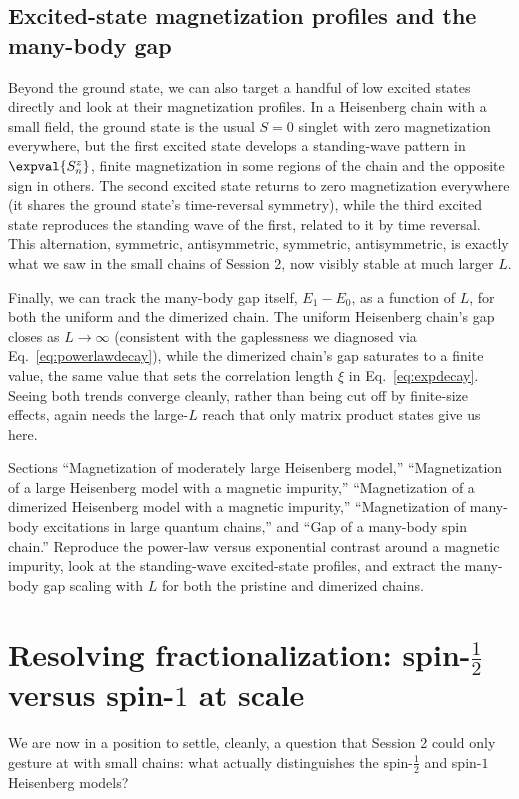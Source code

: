 \documentclass[all_sessions.tex]{subfiles}
\begin{document}
\subsection{Excited-state magnetization profiles and the many-body gap}
Beyond the ground state, we can also target a handful of low excited states directly and look at
their magnetization profiles. In a Heisenberg chain with a small field, the ground state is the
usual $S=0$ singlet with zero magnetization everywhere, but the first excited state develops a
standing-wave pattern in $\expval{S_n^z}$, finite magnetization in some regions of the chain and
the opposite sign in others. The second excited state returns to zero magnetization everywhere
(it shares the ground state's time-reversal symmetry), while the third excited state reproduces
the standing wave of the first, related to it by time reversal. This alternation, symmetric,
antisymmetric, symmetric, antisymmetric, is exactly what we saw in the small chains of Session 2,
now visibly stable at much larger $L$.

Finally, we can track the many-body gap itself, $E_1 - E_0$, as a function of $L$, for both the
uniform and the dimerized chain. The uniform Heisenberg chain's gap closes as $L\to\infty$
(consistent with the gaplessness we diagnosed via Eq.~\eqref{eq:powerlawdecay}), while the
dimerized chain's gap saturates to a finite value, the same value that sets the correlation length
$\xi$ in Eq.~\eqref{eq:expdecay}. Seeing both trends converge cleanly, rather than being cut off by
finite-size effects, again needs the large-$L$ reach that only matrix product states give us here.

\begin{notebook}
Sections ``Magnetization of moderately large Heisenberg model,'' ``Magnetization of a large
Heisenberg model with a magnetic impurity,'' ``Magnetization of a dimerized Heisenberg model with
a magnetic impurity,'' ``Magnetization of many-body excitations in large quantum chains,'' and
``Gap of a many-body spin chain.'' Reproduce the power-law versus exponential contrast around a
magnetic impurity, look at the standing-wave excited-state profiles, and extract the many-body gap
scaling with $L$ for both the pristine and dimerized chains.
\end{notebook}

\section{Resolving fractionalization: spin-$\tfrac12$ versus spin-$1$ at scale}
\label{sec:fractionalization}
We are now in a position to settle, cleanly, a question that Session 2 could only gesture at with
small chains: what actually distinguishes the spin-$\tfrac12$ and spin-$1$ Heisenberg models?
\end{document}
